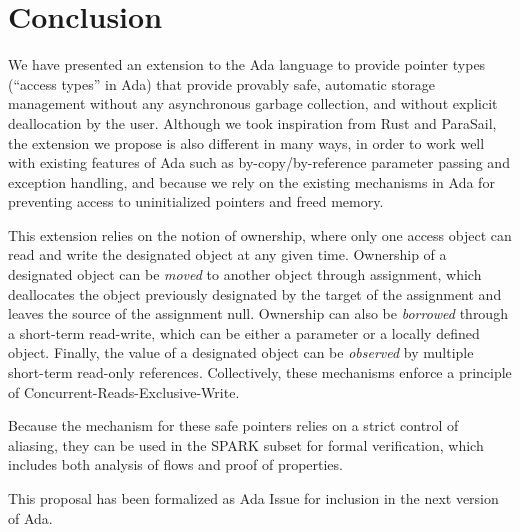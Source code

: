 \documentclass{llncs}
\begin{document}
\section{Conclusion}
We have presented an extension to the Ada language to provide pointer types (``access types'' in Ada) that provide provably safe, automatic
storage management without any asynchronous garbage collection, and without explicit deallocation by the user. Although we took inspiration
from Rust and ParaSail, the extension we propose is also different in many ways, in order to work well with existing features of Ada such
as by-copy/by-reference parameter passing and exception handling, and because we rely on the existing mechanisms in Ada for preventing access
to uninitialized pointers and freed memory. 

This extension relies on the notion of ownership, where only one access object can read and write the designated object at any given time.
Ownership of a designated object can be \textit{moved} to another object through assignment, which deallocates the object previously designated
by the target of the assignment and leaves the source of the assignment null. Ownership can also be \textit{borrowed} through a short-term read-write,
which can be either a parameter or a locally defined object. Finally, the value of a designated object can be \textit{observed} by multiple short-term
read-only references. Collectively, these mechanisms enforce a principle of Concurrent-Reads-Exclusive-Write.

Because the mechanism for these safe pointers relies on a strict control of aliasing, they can be used in the SPARK subset for formal verification, which
includes both analysis of flows and proof of properties. 

This proposal has been formalized as Ada Issue \cite{AI2017} for inclusion in the next version of Ada.

\printbibliography[title={References}]
\end{document}
